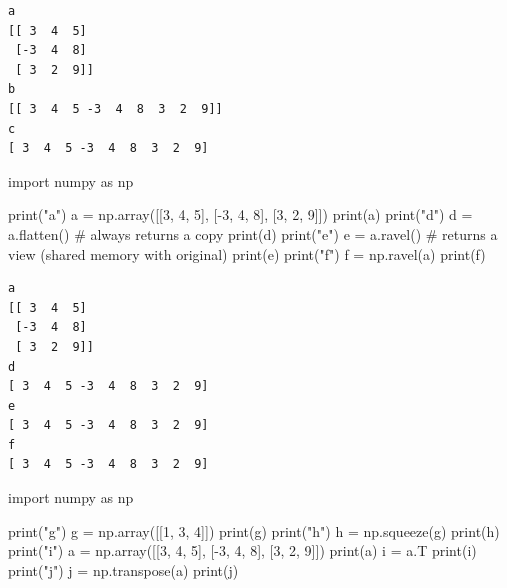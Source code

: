 \documentclass[
  english,
  letterpaper,
  DIV=11,
  numbers=noendperiod]{scrreprt}
\newenvironment{Shaded}{\begin{snugshade}}{\end{snugshade}}
\newcommand{\BuiltInTok}[1]{\textcolor[rgb]{0.00,0.23,0.31}{#1}}
\newcommand{\CommentTok}[1]{\textcolor[rgb]{0.37,0.37,0.37}{#1}}
\newcommand{\DecValTok}[1]{\textcolor[rgb]{0.68,0.00,0.00}{#1}}
\newcommand{\ImportTok}[1]{\textcolor[rgb]{0.00,0.46,0.62}{#1}}
\newcommand{\NormalTok}[1]{\textcolor[rgb]{0.00,0.23,0.31}{#1}}
\newcommand{\OperatorTok}[1]{\textcolor[rgb]{0.37,0.37,0.37}{#1}}
\newcommand{\StringTok}[1]{\textcolor[rgb]{0.13,0.47,0.30}{#1}}
\begin{document}
\begin{verbatim}
a
[[ 3  4  5]
 [-3  4  8]
 [ 3  2  9]]
b
[[ 3  4  5 -3  4  8  3  2  9]]
c
[ 3  4  5 -3  4  8  3  2  9]
\end{verbatim}

\begin{Shaded}
\begin{Highlighting}[]
\ImportTok{import}\NormalTok{ numpy }\ImportTok{as}\NormalTok{ np}

\BuiltInTok{print}\NormalTok{(}\StringTok{"a"}\NormalTok{)}
\NormalTok{a }\OperatorTok{=}\NormalTok{ np.array([[}\DecValTok{3}\NormalTok{, }\DecValTok{4}\NormalTok{, }\DecValTok{5}\NormalTok{], [}\OperatorTok{{-}}\DecValTok{3}\NormalTok{, }\DecValTok{4}\NormalTok{, }\DecValTok{8}\NormalTok{], [}\DecValTok{3}\NormalTok{, }\DecValTok{2}\NormalTok{, }\DecValTok{9}\NormalTok{]])}
\BuiltInTok{print}\NormalTok{(a)}
\BuiltInTok{print}\NormalTok{(}\StringTok{"d"}\NormalTok{)}
\NormalTok{d }\OperatorTok{=}\NormalTok{ a.flatten()   }\CommentTok{\# always returns a copy}
\BuiltInTok{print}\NormalTok{(d)}
\BuiltInTok{print}\NormalTok{(}\StringTok{"e"}\NormalTok{)}
\NormalTok{e }\OperatorTok{=}\NormalTok{ a.ravel()     }\CommentTok{\# returns a view (shared memory with original)}
\BuiltInTok{print}\NormalTok{(e)}
\BuiltInTok{print}\NormalTok{(}\StringTok{"f"}\NormalTok{)}
\NormalTok{f }\OperatorTok{=}\NormalTok{ np.ravel(a)}
\BuiltInTok{print}\NormalTok{(f)}
\end{Highlighting}
\end{Shaded}

\begin{verbatim}
a
[[ 3  4  5]
 [-3  4  8]
 [ 3  2  9]]
d
[ 3  4  5 -3  4  8  3  2  9]
e
[ 3  4  5 -3  4  8  3  2  9]
f
[ 3  4  5 -3  4  8  3  2  9]
\end{verbatim}

\begin{Shaded}
\begin{Highlighting}[]
\ImportTok{import}\NormalTok{ numpy }\ImportTok{as}\NormalTok{ np}

\BuiltInTok{print}\NormalTok{(}\StringTok{"g"}\NormalTok{)}
\NormalTok{g }\OperatorTok{=}\NormalTok{ np.array([[}\DecValTok{1}\NormalTok{, }\DecValTok{3}\NormalTok{, }\DecValTok{4}\NormalTok{]])}
\BuiltInTok{print}\NormalTok{(g)}
\BuiltInTok{print}\NormalTok{(}\StringTok{"h"}\NormalTok{)}
\NormalTok{h }\OperatorTok{=}\NormalTok{ np.squeeze(g)}
\BuiltInTok{print}\NormalTok{(h)}
\BuiltInTok{print}\NormalTok{(}\StringTok{"i"}\NormalTok{)}
\NormalTok{a }\OperatorTok{=}\NormalTok{ np.array([[}\DecValTok{3}\NormalTok{, }\DecValTok{4}\NormalTok{, }\DecValTok{5}\NormalTok{], [}\OperatorTok{{-}}\DecValTok{3}\NormalTok{, }\DecValTok{4}\NormalTok{, }\DecValTok{8}\NormalTok{], [}\DecValTok{3}\NormalTok{, }\DecValTok{2}\NormalTok{, }\DecValTok{9}\NormalTok{]])}
\BuiltInTok{print}\NormalTok{(a)}
\NormalTok{i }\OperatorTok{=}\NormalTok{ a.T}
\BuiltInTok{print}\NormalTok{(i)}
\BuiltInTok{print}\NormalTok{(}\StringTok{"j"}\NormalTok{)}
\NormalTok{j }\OperatorTok{=}\NormalTok{ np.transpose(a)}
\BuiltInTok{print}\NormalTok{(j)}
\end{Highlighting}
\end{Shaded}
\end{document}
